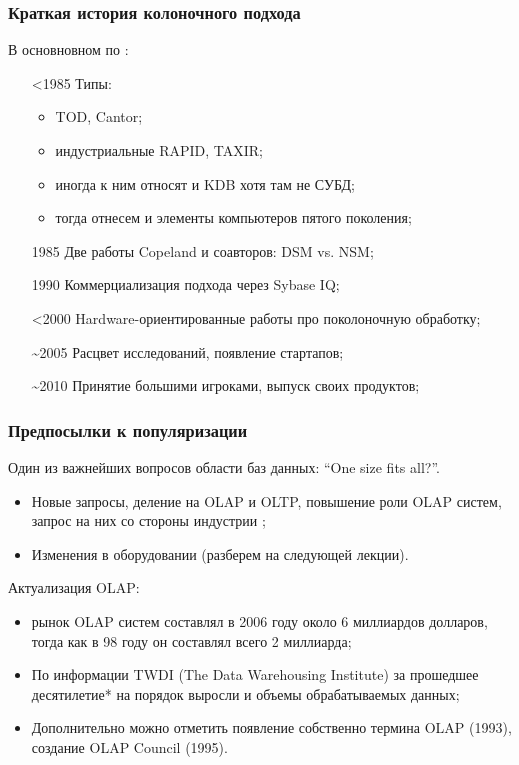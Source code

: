 \documentclass{beamer}
\begin{document}
\begin{frame}
\frametitle{Краткая история колоночного подхода}

В основновном по \cite{Harizopoulos2009}:

\begin{itemize}
  \setlength\itemsep{1em}
  \item[<1985] Типы: 
  \begin{itemize}
    \item TOD, Cantor;
    \item индустриальные RAPID, TAXIR;
    \item иногда к ним относят и KDB хотя там не СУБД;
    \item тогда отнесем и элементы компьютеров пятого поколения;
  \end{itemize}
  \item[1985] Две работы Copeland и соавторов: DSM vs. NSM;
  \item[1990] Коммерциализация подхода через Sybase IQ;
  \item[<2000] Hardware-ориентированные работы про поколоночную обработку;
  \item[\textasciitilde 2005] Расцвет исследований, появление стартапов;
  \item[\textasciitilde 2010] Принятие большими игроками, выпуск своих продуктов;
  
\end{itemize}

\end{frame}

\begin{frame}
\frametitle{Предпосылки к популяризации}

Один из важнейших вопросов области баз данных: ``One size fits all?''.\\

\begin{itemize}
  \setlength\itemsep{1em}
  \item Новые запросы, деление на OLAP и OLTP, повышение роли OLAP систем, запрос на них со стороны индустрии \cite{Chernishev2013};
  \item Изменения в оборудовании (разберем на следующей лекции).
\end{itemize}

Актуализация OLAP:

\begin{itemize}
  \setlength\itemsep{1em}
  \item рынок OLAP систем составлял в 2006 году около 6 миллиардов долларов, тогда как в 98 году он составлял всего 2 миллиарда;
  \item По информации TWDI (The Data Warehousing Institute) за прошедшее десятилетие* на порядок выросли и объемы обрабатываемых данных;
  \item Дополнительно можно отметить появление собственно термина OLAP (1993), создание OLAP Council (1995). 
\end{itemize}

 
\end{frame}
\end{document}
